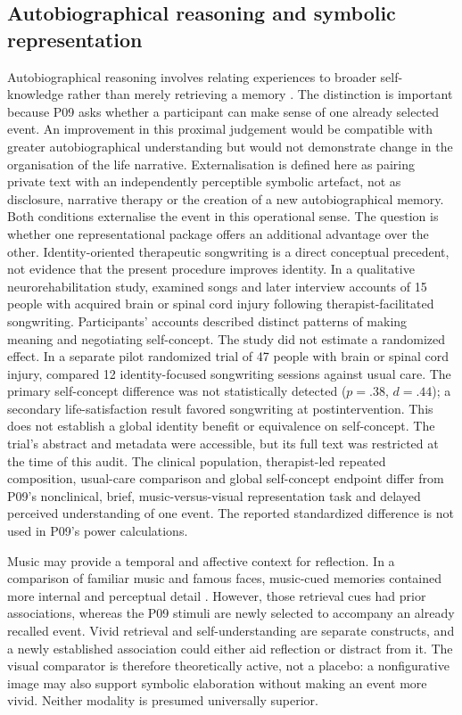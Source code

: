 \documentclass[11pt,a4paper]{article}
\begin{document}
\subsection{Autobiographical reasoning and symbolic representation}
Autobiographical reasoning involves relating experiences to broader self-knowledge rather than merely retrieving a memory \citep{habermas2000,pasupathi2007}. The distinction is important because P09 asks whether a participant can make sense of one already selected event. An improvement in this proximal judgement would be compatible with greater autobiographical understanding but would not demonstrate change in the organisation of the life narrative. Externalisation is defined here as pairing private text with an independently perceptible symbolic artefact, not as disclosure, narrative therapy or the creation of a new autobiographical memory. Both conditions externalise the event in this operational sense. The question is whether one representational package offers an additional advantage over the other. Identity-oriented therapeutic songwriting is a direct conceptual precedent, not evidence that the present procedure improves identity. In a qualitative neurorehabilitation study, \citet{baker2018meaning} examined songs and later interview accounts of 15 people with acquired brain or spinal cord injury following therapist-facilitated songwriting. Participants' accounts described distinct patterns of making meaning and negotiating self-concept. The study did not estimate a randomized effect. In a separate pilot randomized trial of 47 people with brain or spinal cord injury, \citet{baker2019trial} compared 12 identity-focused songwriting sessions against usual care. The primary self-concept difference was not statistically detected ($p=.38$, $d=.44$); a secondary life-satisfaction result favored songwriting at postintervention. This does not establish a global identity benefit or equivalence on self-concept. The trial's abstract and metadata were accessible, but its full text was restricted at the time of this audit. The clinical population, therapist-led repeated composition, usual-care comparison and global self-concept endpoint differ from P09's nonclinical, brief, music-versus-visual representation task and delayed perceived understanding of one event. The reported standardized difference is not used in P09's power calculations.
\par Music may provide a temporal and affective context for reflection. In a comparison of familiar music and famous faces, music-cued memories contained more internal and perceptual detail \citep{belfi2016}. However, those retrieval cues had prior associations, whereas the P09 stimuli are newly selected to accompany an already recalled event. Vivid retrieval and self-understanding are separate constructs, and a newly established association could either aid reflection or distract from it. The visual comparator is therefore theoretically active, not a placebo: a nonfigurative image may also support symbolic elaboration without making an event more vivid. Neither modality is presumed universally superior.
\end{document}
